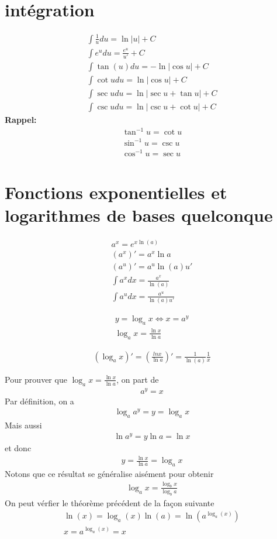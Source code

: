 \section{intégration}
\begin{eqnarray}
	\int\frac{1}{u}du=\ln |u|+C
	\\
	\int e^udu=\frac{e^u}{u'}+C
	\\
	\int\tan{(u)}du=-\ln{|\cos{u}|}+C
	\\
	\int\cot{u}du=\ln{|\cos{u}|}+C
	\\
	\int\sec{u}du=\ln{|\sec{u}+\tan{u}|}+C
	\\
	\int\csc{u}du=\ln{|\csc{u}+\cot{u}|}+C
\end{eqnarray}
\textbf{Rappel:}
\begin{eqnarray}
	\tan^{-1}{u}=\cot{u}
	\\
	\sin^{-1}{u}=\csc{u}
	\\
	\cos^{-1}{u}=\sec{u}
\end{eqnarray}

\section{Fonctions exponentielles et logarithmes de bases quelconque}
\begin{eqnarray}
	a^x=e^{x\ln{(a)}}
	\\
	(a^x)'=a^x\ln{a}
	\\
	(a^u)'=a^u\ln{(a)}u'
	\\
	\int a^xdx=\frac{a^x}{\ln{(a)}}
	\\
	\int a^udx=\frac{a^u}{\ln{(a)}u'}
\end{eqnarray}

\begin{eqnarray}
	y=\log_ax\Leftrightarrow x=a^y
	\\
	\log_ax=\frac{\ln x}{\ln a}
\end{eqnarray}

\begin{eqnarray}
	(\log_ax)'=\left(\frac{ln x}{\ln a}\right)'=\frac{1}{\ln(a)}\frac{1}{x}
\end{eqnarray}

Pour prouver que $\log_ax=\frac{\ln{x}}{\ln{a}}$, on part de
\begin{eqnarray*}
	a^y=x
\end{eqnarray*}
Par définition, on a
\begin{eqnarray*}
	\log_a{a^y}=y=\log_a x
\end{eqnarray*}
Mais aussi
\begin{eqnarray*}
	\ln{a^y}=y\ln{a}=\ln{x}
\end{eqnarray*}
et donc
\begin{eqnarray*}
	y=\frac{\ln{x}}{\ln{a}}=\log_ax
\end{eqnarray*}
Notons que ce résultat se généralise aisément pour obtenir
\begin{eqnarray}
	\log_a{x}=\frac{\log_bx}{\log_ba}
\end{eqnarray}
On peut vérfier le théorème précédent de la façon suivante
\begin{eqnarray*}
	\ln{(x)}=\log_a{(x)}\ln{(a)}=\ln{(a^{\log_a{(x)}})}\\
	x=a^{\log_a{(x)}}=x
\end{eqnarray*}

